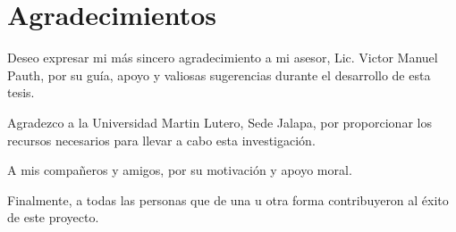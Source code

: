 \section*{Agradecimientos}

Deseo expresar mi más sincero agradecimiento a mi asesor, Lic. Victor Manuel Pauth, por su guía, apoyo y valiosas sugerencias durante el desarrollo de esta tesis.

Agradezco a la Universidad Martin Lutero, Sede Jalapa, por proporcionar los recursos necesarios para llevar a cabo esta investigación.

A mis compañeros y amigos, por su motivación y apoyo moral.

Finalmente, a todas las personas que de una u otra forma contribuyeron al éxito de este proyecto.